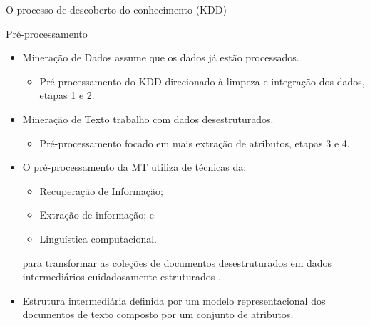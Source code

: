 \documentclass[%
  10pt,%
  aspectratio = 169,%
  compress,%
  t,%
]{beamer}%
\begin{document}
    \begin{frame}[fragile = singleslide]{}{O processo de descoberto do conhecimento (KDD)}
        
    \end{frame}

    \begin{frame}[fragile = singleslide]{}{Pré-processamento}
        \begin{itemize}
            \item Mineração de Dados assume que os dados já estão processados.
            \begin{itemize}
                \item Pré-processamento do KDD direcionado à limpeza e integração dos dados, etapas 1 e 2.
            \end{itemize}

            \item Mineração de Texto trabalho com dados desestruturados.
                \begin{itemize}
                    \item Pré-processamento focado em mais extração de atributos, etapas 3 e 4.
                \end{itemize}

            \item O pré-processamento da MT utiliza de técnicas da:
            \begin{itemize}
                \item Recuperação de Informação;
                \item Extração de informação; e
                \item Linguística computacional.
            \end{itemize}
            para transformar as coleções de documentos desestruturados em dados intermediários cuidadosamente estruturados \cite[p.~2--3]{Feldman:2006:TMH:1076381}.

            \item Estrutura intermediária definida por um modelo representacional dos documentos de texto composto por um conjunto de atributos.
        \end{itemize}
    \end{frame}
\end{document}
